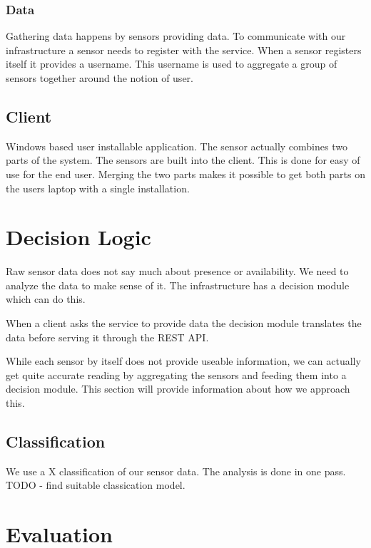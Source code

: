 \documentclass{sigchi}
\begin{document}
\subsubsection{Data}
Gathering data happens by sensors providing data.
To communicate with our infrastructure a sensor needs to register with the service.
When a sensor registers itself it provides a username.
This username is used to aggregate a group of sensors together around the notion of user.

\subsection{Client}
Windows based user installable application.
The sensor actually combines two parts of the system.
The sensors are built into the client.
This is done for easy of use for the end user.
Merging the two parts makes it possible to get both parts on the users laptop with a single installation.

\section{Decision Logic}
Raw sensor data does not say much about presence or availability.
We need to analyze the data to make sense of it.
The infrastructure has a decision module which can do this.

When a client asks the service to provide data the decision module translates the data before serving it through the REST API.

While each sensor by itself does not provide useable information, we can actually get quite accurate reading by aggregating the sensors and feeding them into a decision module.
This section will provide information about how we approach this.

\subsection{Classification}
We use a X classification of our sensor data.
The analysis is done in one pass.
TODO - find suitable classication model.


\section{Evaluation}
\end{document}
